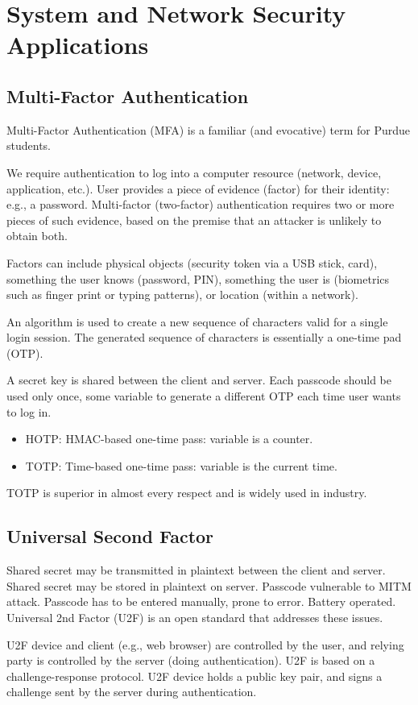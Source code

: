 \section{System and Network Security Applications}

\subsection{Multi-Factor Authentication}

Multi-Factor Authentication (MFA) is a familiar (and evocative)
term for Purdue students. 

We require authentication to log into a computer resource (network, device,
application, etc.).
User provides a piece of evidence (factor) for their identity: e.g., a password.
Multi-factor (two-factor) authentication requires two or more pieces of such evidence,
based on the premise that an attacker is unlikely to obtain both. 

Factors can include physical objects (security token via a USB stick, card),
something the user knows (password, PIN), something the user is (biometrics such
as finger print or typing patterns), or location (within a network).

An algorithm is used to create a new
sequence of characters valid for a
single login session.
The generated sequence of characters
is essentially a one-time pad (OTP).

A secret key is shared between the client and server.
Each passcode should be used only once,
some variable to generate a different
OTP each time user wants to log in.
\begin{itemize}
    \item HOTP: HMAC-based one-time pass: variable is a counter.
    \item TOTP: Time-based one-time pass: variable is the current time.
\end{itemize}
TOTP is superior in almost every respect and is widely 
used in industry. 

\subsection{Universal Second Factor}

Shared secret may be transmitted in plaintext between the client and server.
Shared secret may be stored in plaintext on server.
Passcode vulnerable to MITM attack.
Passcode has to be entered manually, prone to error.
Battery operated.
Universal 2nd Factor (U2F) is an open standard that addresses these issues.

U2F device and client (e.g.,
web browser) are controlled
by the user, and relying party
is controlled by the server
(doing authentication).
U2F is based on a
challenge-response protocol.
U2F device holds a public key
pair, and signs a challenge
sent by the server during
authentication.
